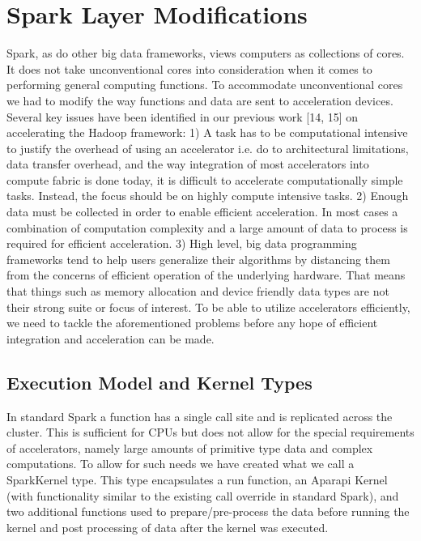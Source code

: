 \documentclass[runningheads,a4paper]{llncs}
\begin{document}
\section{Spark Layer Modifications}
Spark, as do other big data frameworks, views computers as collections of cores. It does not take unconventional cores into consideration when it comes to performing general computing functions. To accommodate unconventional
cores we had to modify the way functions and data are sent to acceleration devices. Several key issues have been identified in our previous work [14, 15] on accelerating the Hadoop framework:
1) A task has to be computational intensive to justify the overhead of using an accelerator i.e. do to architectural limitations, data transfer overhead, and the way integration of most accelerators into compute fabric is done today, it is difficult to accelerate computationally simple tasks. Instead, the focus should be on highly compute intensive tasks.
2) Enough data must be collected in order to enable efficient acceleration. In most cases a combination of computation complexity and a large amount of data to process is required for efficient acceleration.
3) High level, big data programming frameworks tend to help users generalize their algorithms by distancing them from the concerns of efficient operation of the underlying hardware. That means that things such as memory allocation and device friendly data types are not their strong suite or focus of interest.
To be able to utilize accelerators efficiently, we need to tackle the aforementioned problems before any hope of efficient integration and acceleration can be made.


\subsection{Execution Model and Kernel Types}
In standard Spark a function has a single call site and is replicated across the cluster. This is sufficient for CPUs but does not allow for the special requirements of accelerators, namely large amounts of primitive type data and complex computations. To allow for such needs we have created what we call a SparkKernel type. This type encapsulates a run function, an Aparapi Kernel (with functionality similar to the existing call override in standard Spark), and two additional functions used to prepare/pre-process the data before running the kernel and post processing of data after the kernel was executed.
\end{document}
